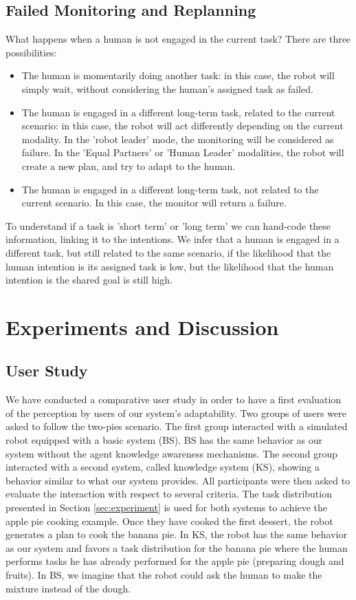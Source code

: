 \subsection{Failed Monitoring and Replanning}
What happens when a human is not engaged in the current task? There are three possibilities:
\begin{itemize}
\item The human is momentarily doing another task: in this case, the robot will simply wait, without considering the human's assigned task as failed.
\item The human is engaged in a different long-term task, related to the current scenario: in this case, the robot will act differently depending on the current modality. In the 'robot leader' mode, the monitoring will be considered as failure. In the 'Equal Partners' or 'Human Leader' modalities, the robot will create a new plan, and try to adapt to the human.  
\item The human is engaged in a different long-term task, not related to the current scenario. In this case, the monitor will return a failure.
\end{itemize}

To understand if a task is 'short term' or 'long term' we can hand-code these information, linking it to the intentions. We infer that a human is engaged in a different task, but still related to the same scenario, if the likelihood that the human intention is its assigned task is low, but the likelihood that the human intention is the shared goal is still high. 



\section{Experiments and Discussion}
\label{study}

\subsection{User Study}
We have conducted a comparative user study in order to have a first evaluation of the perception by users of our system's adaptability. Two groups of users were asked to follow the two-pies scenario. The first group interacted with a simulated robot equipped with a basic system (BS). BS has the same behavior as our system without the agent knowledge awareness mechanisms. The second group interacted with a second system, called knowledge system (KS), showing a behavior similar to what our system provides.
All participants were then asked to evaluate the interaction with respect to several criteria.
%
The task distribution presented in Section \ref{sec:experiment} 
is used for both systems to achieve the apple pie cooking example.
Once they have cooked the first dessert, the robot generates a plan to cook the banana pie. 
In KS,  the robot has the same behavior as our system and  favors a task distribution for the banana pie where the human performs tasks he has already performed for the apple pie (preparing dough and fruits).
In BS, we imagine that the robot could ask the human to make the mixture instead of the dough.

